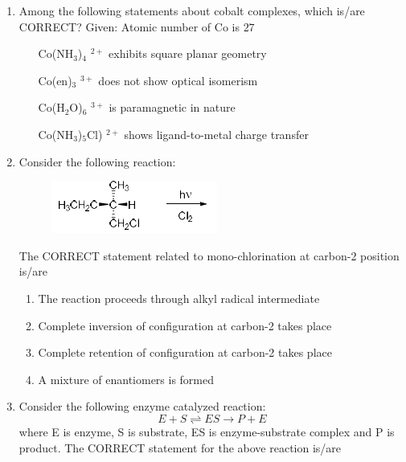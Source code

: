 \documentclass[journal,12pt,onecolumn]{IEEEtran}
\theoremstyle{remark}
\begin{document}
\begin{enumerate}
    \hfill{}

    \item Among the following statements about cobalt complexes, which is/are CORRECT?
    Given: Atomic number of Co is $27$

    \hfill{}
    \begin{enumerate}  
        \item [Co(NH$_3$)$_4$]$^{2+}$ exhibits square planar geometry
        \item [Co(en)$_3$]$^{3+}$ does not show optical isomerism 
        \item [Co(H$_2$O)$_6$]$^{3+}$ is paramagnetic in nature
        \item [Co(NH$_3$)$_5$Cl)]$^{2+}$ shows ligand-to-metal charge transfer
    \end{enumerate}

    \item Consider the following reaction:
    \begin{figure}[H]
        \centering
        \includegraphics[width=0.3\columnwidth]{fig16.png}
        \caption*{}
        \label{fig:q21}
    \end{figure}
    The CORRECT statement related to mono-chlorination at carbon-2 position is/are

    \hfill{}
    \begin{enumerate}
        \item The reaction proceeds through alkyl radical intermediate
        \item Complete inversion of configuration at carbon-2 takes place
        \item Complete retention of configuration at carbon-2 takes place
        \item A mixture of enantiomers is formed
    \end{enumerate}

    \item Consider the following enzyme catalyzed reaction:
    \[ E + S \rightleftharpoons ES \rightarrow P + E \]
    where E is enzyme, S is substrate, ES is enzyme-substrate complex and P is product.
    The CORRECT statement for the above reaction is/are


\end{enumerate}
\end{document}
